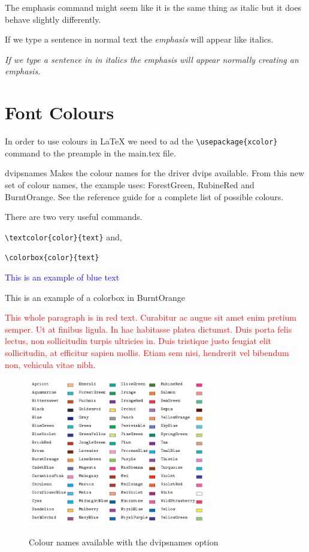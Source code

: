\vspace{0.4cm}

The emphasis command might seem like it is the same thing as italic but it does behave slightly differently. 

If we type a sentence in normal text the \emph{emphasis} will appear like italics.

\textit{If we type a sentence in in italics the  \emph{emphasis} will appear normally creating an emphasis.}

\newpage

\section{Font Colours}

In order to use colours in LaTeX we need to ad the \verb|\usepackage{xcolor}| command to the preample in the main.tex file. 

dvipsnames Makes the colour names for the driver dvips available. From this new set of colour names, the example uses: ForestGreen, RubineRed and BurntOrange. See the reference guide for a complete list of possible colours.

There are two very useful commands. 

\verb|\textcolor{color}{text}| and, 

\verb|\colorbox{color}{text}|

\textcolor{blue}{This is an example of blue text}

\colorbox{BurntOrange}{This is an example of a colorbox in BurntOrange}

\textcolor{red}{This whole paragraph is in red text. Curabitur ac augue sit amet enim pretium semper. Ut at finibus ligula. In hac habitasse platea dictumst. Duis porta felis lectus, non sollicitudin turpis ultricies in. Duis tristique justo feugiat elit sollicitudin, at efficitur sapien mollis. Etiam sem nisi, hendrerit vel bibendum non, vehicula vitae nibh.}

\vspace{0.4cm}

\begin{figure}[h]
\centering
\includegraphics[width=0.7\textwidth]{images/ColoursEx6.png}
\caption{Colour names available with the dvipsnames option}
\label{fig:x Color options} \parencite{overleaf01}
\end{figure}


